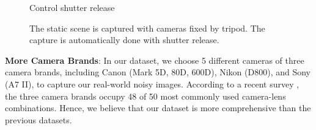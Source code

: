 \begin{figure}
{\begin{minipage}[t]{0.4\textwidth}
{\footnotesize Control shutter release}
\end{minipage}
}
    \caption{The static scene is captured with cameras fixed by tripod. The capture is automatically done with shutter release.}
    \label{fig6-2}
\end{figure}

\textbf{More Camera Brands}: In our dataset, we choose 5 different cameras of three camera brands, including Canon (Mark 5D, 80D, 600D), Nikon (D800), and Sony (A7 II), to capture our real-world noisy images. According to a recent survey \cite{commoncamera}, the three camera brands occupy 48 of 50 most commonly used camera-lens combinations. Hence, we believe that our dataset is more comprehensive than the previous datasets.



